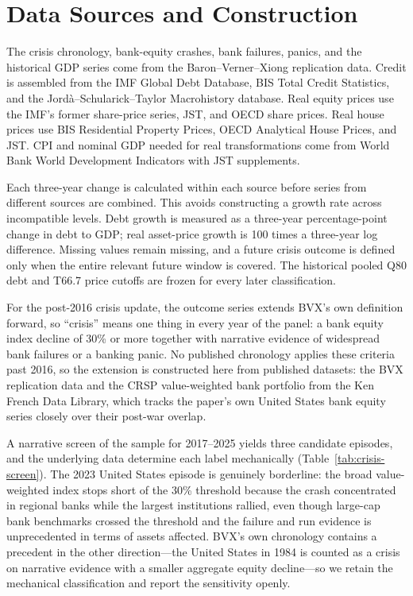 \documentclass[11pt]{article}
\begin{document}
\section{Data Sources and Construction}

The crisis chronology, bank-equity crashes, bank failures, panics, and the
historical GDP series come from the Baron--Verner--Xiong replication data.
Credit is assembled from the IMF Global Debt Database, BIS Total Credit
Statistics, and the Jord\`a--Schularick--Taylor Macrohistory database. Real
equity prices use the IMF's former share-price series, JST, and OECD share
prices. Real house prices use BIS Residential Property Prices, OECD Analytical
House Prices, and JST. CPI and nominal GDP needed for real transformations come
from World Bank World Development Indicators with JST supplements.

Each three-year change is calculated within each source before series from
different sources are combined. This avoids constructing a growth rate across
incompatible levels.
Debt growth is measured as a three-year percentage-point change in debt to GDP;
real asset-price growth is 100 times a three-year log difference. Missing
values remain missing, and a future crisis outcome is defined only when the
entire relevant future window is covered. The historical pooled Q80 debt and
T66.7 price cutoffs are frozen for every later classification.

For the post-2016 crisis update, the outcome series extends BVX's own
definition forward, so ``crisis'' means one thing in every year of the panel:
a bank equity index decline of 30\% or more together with narrative evidence
of widespread bank failures or a banking panic. No published chronology
applies these criteria past 2016, so the extension is constructed here from
published datasets: the BVX replication data and the CRSP value-weighted bank
portfolio from the Ken French Data Library, which tracks the paper's own
United States bank equity series closely over their post-war overlap.

A narrative screen of the sample for 2017--2025 yields three candidate
episodes, and the underlying data determine each label mechanically
(Table~\ref{tab:crisis-screen}). The 2023 United States episode is genuinely
borderline: the broad value-weighted index stops short of the 30\% threshold
because the crash concentrated in regional banks while the largest
institutions rallied, even though large-cap bank benchmarks crossed the
threshold and the failure and run evidence is unprecedented in terms of
assets affected. BVX's own chronology contains a precedent in the other
direction---the United States in 1984 is counted as a crisis on narrative
evidence with a smaller aggregate equity decline---so we retain the
mechanical classification and report the sensitivity openly.
\end{document}
